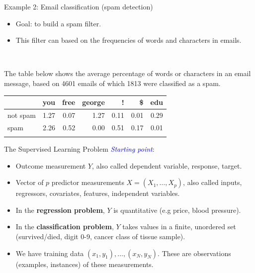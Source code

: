 \documentclass[
  ignorenonframetext,
]{beamer}
\providecommand{\tightlist}{%
  \setlength{\itemsep}{0pt}\setlength{\parskip}{0pt}}
\begin{document}
\begin{frame}
\begin{block}{Example 2: Email classification (spam detection)}
\protect\hypertarget{example-2-email-classification-spam-detection}{}
\(~\)

\begin{itemize}
\tightlist
\item
  Goal: to build a spam filter.
\end{itemize}

\vspace{1mm}

\begin{itemize}
\tightlist
\item
  This filter can based on the frequencies of words and characters in
  emails.
\end{itemize}

\(~\)

The table below shows the average percentage of words or characters in
an email message, based on 4601 emails of which 1813 were classified as
a spam.

\begin{longtable}[]{@{}lrrrrrr@{}}
\toprule\noalign{}
& you & free & george & ! & \$ & edu \\
\midrule\noalign{}
\endhead
not spam & 1.27 & 0.07 & 1.27 & 0.11 & 0.01 & 0.29 \\
spam & 2.26 & 0.52 & 0.00 & 0.51 & 0.17 & 0.01 \\
\bottomrule\noalign{}
\end{longtable}
\end{block}
\end{frame}

\begin{frame}{The Supervised Learning Problem}
\protect\hypertarget{the-supervised-learning-problem}{}
\textcolor{blue}{\emph{Starting point}}:

\begin{itemize}
\item
  Outcome measurement \(Y\), also called dependent variable, response,
  target.
\item
  Vector of \(p\) predictor measurements \(X=(X_1,\ldots,X_p)\), also
  called inputs, regressors, covariates, features, independent
  variables.
\item
  In the \textbf{regression problem}, \(Y\) is quantitative (e.g price,
  blood pressure).
\item
  In the \textbf{classification problem}, \(Y\) takes values in a
  finite, unordered set (survived/died, digit 0-9, cancer class of
  tissue sample).
\item
  We have training data \((x_1, y_1), \ldots , (x_N , y_N )\). These are
  observations (examples, instances) of these measurements.
\end{itemize}
\end{frame}
\end{document}
